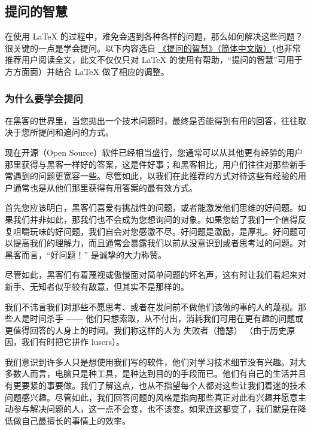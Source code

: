 
\subsection{提问的智慧}

在使用 \LaTeX{} 的过程中，难免会遇到各种各样的问题，那么如何解决这些问题？很关键的一点是学会提问。以下内容选自 \href{https://github.com/ryanhanwu/How-To-Ask-Questions-The-Smart-Way/blob/main/README-zh_CN.md}{《提问的智慧》（简体中文版）}（也非常推荐用户阅读全文，此文不仅仅只对 \LaTeX{} 的使用有帮助，“提问的智慧”可用于方方面面）并结合 \LaTeX{} 做了相应的调整。


\subsubsection{为什么要学会提问}

在黑客的世界里，当您拋出一个技术问题时，最终是否能得到有用的回答，往往取决于您所提问和追问的方式。

现在开源（Open Source）软件已经相当盛行，您通常可以从其他更有经验的用户那里获得与黑客一样好的答案，这是件好事；和黑客相比，用户们往往对那些新手常遇到的问题更宽容一些。尽管如此，以我们在此推荐的方式对待这些有经验的用户通常也是从他们那里获得有用答案的最有效方式。

首先您应该明白，黑客们喜爱有挑战性的问题，或者能激发他们思维的好问题。如果我们并非如此，那我们也不会成为您想询问的对象。如果您给了我们一个值得反复咀嚼玩味的好问题，我们自会对您感激不尽。好问题是激励，是厚礼。好问题可以提高我们的理解力，而且通常会暴露我们以前从没意识到或者思考过的问题。对黑客而言，“好问题！” 是诚挚的大力称赞。

尽管如此，黑客们有着蔑视或傲慢面对简单问题的坏名声，这有时让我们看起来对新手、无知者似乎较有敌意，但其实不是那样的。

我们不讳言我们对那些不愿思考、或者在发问前不做他们该做的事的人的蔑视。那些人是时间杀手 —— 他们只想索取，从不付出，消耗我们可用在更有趣的问题或更值得回答的人身上的时间。我们称这样的人为 失败者（撸瑟） （由于历史原因，我们有时把它拼作 lusers）。

我们意识到许多人只是想使用我们写的软件，他们对学习技术细节没有兴趣。对大多数人而言，电脑只是种工具，是种达到目的的手段而已。他们有自己的生活并且有更要紧的事要做。我们了解这点，也从不指望每个人都对这些让我们着迷的技术问题感兴趣。尽管如此，我们回答问题的风格是指向那些真正对此有兴趣并愿意主动参与解决问题的人，这一点不会变，也不该变。如果连这都变了，我们就是在降低做自己最擅长的事情上的效率。

